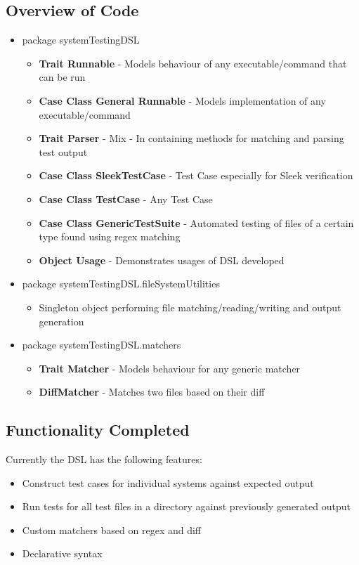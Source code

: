 \documentclass[12 pt]{article}
\begin{document}
\subsection{Overview of Code}
\begin{itemize}
\item package systemTestingDSL
    \begin{itemize}
        \item \textbf{Trait Runnable} - Models behaviour of any executable/command that can be run
        \item \textbf{Case Class General Runnable} - Models implementation of any executable/command 
        \item \textbf{Trait Parser} - Mix - In containing methods for matching and parsing test output
        \item \textbf{Case Class SleekTestCase} - Test Case especially for Sleek verification
        \item \textbf{Case Class TestCase} - Any Test Case
        \item \textbf{Case Class GenericTestSuite} - Automated testing of files of a certain type found          using regex matching
        \item \textbf{Object Usage} - Demonstrates usages of DSL developed
    \end{itemize}
\item package systemTestingDSL.fileSystemUtilities
    \begin{itemize}
        \item Singleton object performing file matching/reading/writing and output generation
    \end{itemize}
\item package systemTestingDSL.matchers
    \begin{itemize}
    \item \textbf{Trait Matcher} - Models behaviour for any generic matcher
    \item \textbf{DiffMatcher} - Matches two files based on their diff
    \end{itemize}
\end{itemize}

\subsection{Functionality Completed}
Currently the DSL has the following features:
\begin{itemize}
\item Construct test cases for individual systems against expected output
\item Run tests for all test files in a directory against previously generated output
\item Custom matchers based on regex and diff
\item Declarative syntax
\end{itemize}
\end{document}
